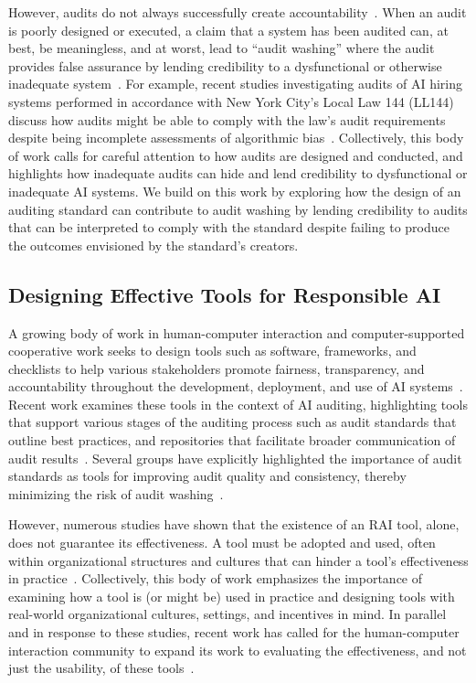 However, audits do not always successfully create accountability~\cite{latonero2021human, selbst2021institutional, goodman2022algorithmic, raji2022outsider}. When an audit is poorly designed or executed, a claim that a system has been audited can, at best, be meaningless, and at worst, lead to ``audit washing'' where the audit provides false assurance by lending credibility to a dysfunctional or otherwise inadequate system~\cite{goodman2022algorithmic}. For example, recent studies investigating audits of AI hiring systems performed in accordance with New York City's Local Law 144 (LL144) discuss how audits might be able to comply with the law's audit requirements despite being incomplete assessments of algorithmic bias~\cite{wright2024null, gerchick2025auditing}. Collectively, this body of work calls for careful attention to how audits are designed and conducted, and highlights how inadequate audits can hide and lend credibility to dysfunctional or inadequate AI systems. We build on this work by exploring how the design of an auditing standard can contribute to audit washing by lending credibility to audits that can be interpreted to comply with the standard despite failing to produce the outcomes envisioned by the standard's creators. 


\subsection{Designing Effective Tools for Responsible AI}
A growing body of work in human-computer interaction and computer-supported cooperative work seeks to design tools such as software, frameworks, and checklists to help various stakeholders promote fairness, transparency, and accountability throughout the development, deployment, and use of AI systems~\cite{deng2022exploring, lee2021landscape,madaio2020co,raji2020closing, gebru2021datasheets, mitchell2019model}. Recent work examines these tools in the context of AI auditing, highlighting tools that support various stages of the auditing process such as audit standards that outline best practices, and repositories that facilitate broader communication of audit results~\cite{ojewale2025towards}. Several groups have explicitly highlighted the importance of audit standards as tools for improving audit quality and consistency, thereby minimizing the risk of audit washing~\cite{costanza2022audits, raji2022outsider, goodman2022algorithmic, ojewale2025towards, lam2024framework}.

However, numerous studies have shown that the existence of an RAI tool, alone, does not guarantee its effectiveness. A tool must be adopted and used, often within organizational structures and cultures that can hinder a tool's effectiveness in practice~\cite{wong2023seeing, madaio2020co, rakova2021responsible, metcalf2021algorithmic}. Collectively, this body of work emphasizes the importance of examining how a tool is (or might be) used in practice and designing tools with real-world organizational cultures, settings, and incentives in mind. In parallel and in response to these studies, recent work has called for the human-computer interaction community to expand its work to evaluating the effectiveness, and not just the usability, of these tools~\cite{berman2024scoping}.

